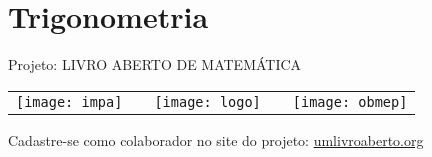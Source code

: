 \ifnum{}
\renewcommand\chapterillustration{./abertura-trigonometria}
\else
\renewcommand\chapterillustration{./abertura-trigonometria-professor}
\fi


\makeatletter
\ifnum{}
\else
\renewcommand*{\toclevel@section}{1}
\renewcommand*{\toclevel@subsection}{4}
\renewcommand*{\toclevel@paragraph}{5}
\renewcommand*{\toclevel@subparagraph}{6}

\renewcommand*{\toclevel@exploresec}{2}
\renewcommand*{\toclevel@practicesec}{2}
\renewcommand*{\toclevel@arrangesec}{2}
\renewcommand*{\toclevel@knowsec}{2}
\renewcommand*{\toclevel@exercisesec}{1}

\setcounter{tocdepth}{2}
\fi
\makeatother

\renewcommand\chapterwhat{Trigonometria em triângulos retângulos e em triângulos não retângulos,  leis dos senos e 
cossenos.}
\renewcommand\chapterbecause{As relações e resultados provenientes da Trigonometria são fundamentais para resolver problemas em diversos contextos, apesar de  muitas vezes não serem utilizados explicitamente no nosso cotidiano. Aplicações relacionadas à Trigonometria podem ser encontradas em diversas áreas, como Física, Engenharia, Arquitetura, Astronomia e Topografia.} 
\chapter{Trigonometria}
\label{trigo-chap}

\mbox{}\thispagestyle{empty}\clearpage

\thispagestyle{empty}

\begin{center}
Projeto: LIVRO ABERTO DE MATEMÁTICA

\noindent \begin{tabular}{lcccr}
\texttt{[image: impa]}& \quad\quad& \texttt{[image: logo]} & \quad\quad& \texttt{[image: obmep]} 
\end{tabular}
\end{center}

\vspace*{.3cm}

Cadastre-se como colaborador no site do projeto: \url{umlivroaberto.org}




